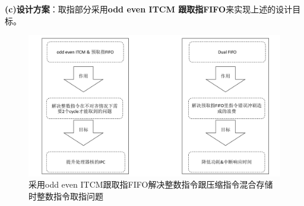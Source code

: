 \documentclass[a4paper, 12pt]{article}
\begin{document}
\textbf{(c)设计方案}：取指部分采用\textbf{odd even ITCM 跟取指FIFO}来实现上述的设计目标。
\begin{figure}
  \centering
  \includegraphics[width=0.8\linewidth]{./images/if_design_features.pdf}
  \caption{采用odd even ITCM跟取指FIFO解决整数指令跟压缩指令混合存储时整数指令取指问题}
  \label{fig:if_design_features}
\end{figure}
\end{document}
